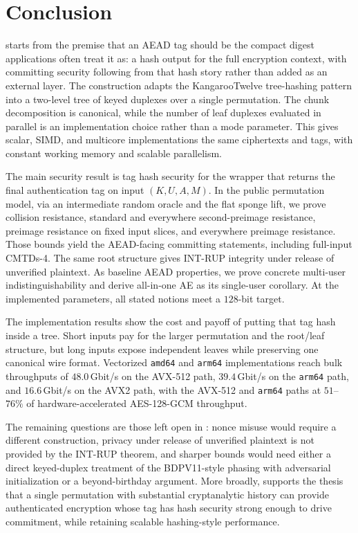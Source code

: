 \section{Conclusion}
\label{sec:conclusion}

\TW{} starts from the premise that an AEAD tag should be the compact digest
applications often treat it as: a hash output for the full encryption context,
with committing security following from that hash story rather than added as an
external layer. The construction adapts the KangarooTwelve tree-hashing pattern
into a two-level tree of keyed duplexes over a single \Keccakp{} permutation.
The chunk decomposition is canonical, while the number of leaf duplexes
evaluated in parallel is an implementation choice rather than a mode parameter.
This gives scalar, SIMD, and multicore implementations the same ciphertexts and
tags, with constant working memory and scalable parallelism.

The main security result is tag hash security for the wrapper that returns the
final authentication tag on input $(K, U, A, M)$. In the public permutation
model, via an intermediate random oracle and the flat sponge lift, we prove
collision resistance, standard and everywhere second-preimage resistance,
preimage resistance on fixed input slices, and everywhere preimage resistance.
Those bounds yield the AEAD-facing committing statements, including full-input
\textsf{CMTDs-4}. The same root structure gives \textsf{INT-RUP}
integrity under release of unverified plaintext. As baseline AEAD properties, we
prove concrete multi-user indistinguishability and derive all-in-one AE as its
single-user corollary. At the implemented parameters, all stated notions meet a
$128$-bit target.

The implementation results show the cost and payoff of putting that tag hash
inside a tree. Short inputs pay for the larger permutation and the root/leaf
structure, but long inputs expose independent leaves while preserving one
canonical wire format. Vectorized \texttt{amd64} and \texttt{arm64}
implementations reach bulk throughputs of $48.0$\,Gbit/s on the AVX-512 path,
$39.4$\,Gbit/s on the \texttt{arm64} path, and $16.6$\,Gbit/s on the AVX2
path, with the AVX-512 and \texttt{arm64} paths at $51$--$76\%$ of
hardware-accelerated AES-128-GCM throughput.

The remaining questions are those left open in : nonce
misuse would require a different construction, privacy under release of
unverified plaintext is not provided by the \textsf{INT-RUP} theorem, and sharper
bounds would need either a direct keyed-duplex treatment of the BDPV11-style
phasing with adversarial initialization or a beyond-birthday argument. More
broadly, \TW{} supports the thesis that a single \Keccak{} permutation with
substantial cryptanalytic history can provide authenticated encryption whose tag
has hash security strong enough to drive commitment, while retaining scalable
hashing-style performance.
